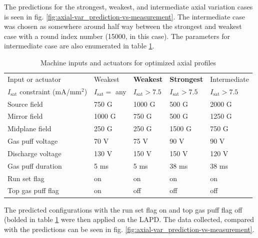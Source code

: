
The predictions for the strongest, weakest, and intermediate axial variation cases is seen in fig. \ref{fig:axial-var_prediction-vs-measurement}. The intermediate case was chosen as somewhere around half way between the strongest and weakest case with a round index number (15000, in this case). The parameters for intermediate case are also enumerated in table \ref{tab:axial_optimization_results}. 

\begin{table}
	\small
	\centering
	\caption{Machine inputs and actuators for optimized axial profiles}
	\label{tab:axial_optimization_results}
	\begin{tabular}{p{1.8 in} | p{0.75 in} p{0.75 in} p{0.75 in} p{0.8 in}}
		Input or actuator & Weakest & \textbf{Weakest} & \textbf{Strongest} & Intermediate \\
		$I_\text{sat}$ constraint (mA/mm$^2$) & $I_\text{sat} = $ any & $I_\text{sat}>7.5$ & $I_\text{sat}>7.5$ & $I_\text{sat}>7.5$\\
		\hline
		Source field      & 750 G   & 1000 G   & 500 G 	& 2000 G \\
		Mirror field      & 1000 G  & 750 G    & 500 G 	& 1250 G \\
		Midplane field    & 250 G   & 250 G    & 1500 G & 750 G \\
		Gas puff voltage  & 70 V    & 75 V     & 90 V 	& 90 V \\
		Discharge voltage & 130 V   & 150 V    & 150 V 	& 120 V \\
		Gas puff duration & 5 ms    & 5 ms     & 38 ms 	& 38 ms \\
		Run set flag      & on      & on       & on 	& on \\
		Top gas puff flag & on      & off      & off 	& off \\
	\end{tabular}
\end{table}

The predicted configurations with the run set flag on and top gas puff flag off (bolded in table \ref{tab:axial_optimization_results} were then applied on the LAPD. The data collected, compared with the predictions can be seen in fig. \ref{fig:axial-var_prediction-vs-measurement}.

